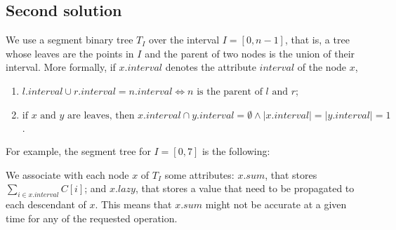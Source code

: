 \subsection{Second solution}

We use a segment binary tree $T_I$ over the interval $I = [0, n - 1]$, that is, a tree whose leaves are the points in $I$ and the parent of two nodes is the union of their interval. More formally, if $x.interval$ denotes the attribute $interval$ of the node $x$,
\begin{enumerate}
  \item $l.interval \cup r.interval = n.interval \iff n \text{ is the parent of $l$ and $r$}$;
  \item $\text{if $x$ and $y$ are leaves, then } x.interval \cap y.interval = \emptyset \wedge |x.interval|=|y.interval|=1$.
\end{enumerate}
For example, the segment tree for $I=[0,7]$ is the following:
\begin{center}
\end{center}

We associate with each node $x$ of $T_I$ some attributes: $x.sum$, that stores $\sum_{i \in x.interval} C[i]$; and $x.lazy$, that stores a value that need to be propagated to each descendant of $x$. This means that $x.sum$ might not be accurate at a given time for any of the requested operation.  

